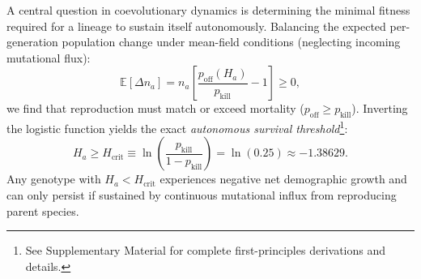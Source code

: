 \documentclass[twocolumn,amsmath,amssymb,aps,pra,10pt,floatfix,nofootinbib]{revtex4-2}
\begin{document}
A central question in coevolutionary dynamics is determining the minimal fitness required for a lineage to sustain itself autonomously. Balancing the expected per-generation population change under mean-field conditions (neglecting incoming mutational flux):
\begin{equation}
\mathbb{E}[\Delta n_a] = n_a \left[ \frac{p_{\text{off}}(H_a)}{p_{\text{kill}}} - 1 \right] \ge 0,
\end{equation}
we find that reproduction must match or exceed mortality ($p_{\text{off}} \ge p_{\text{kill}}$). Inverting the logistic function yields the exact \textit{autonomous survival threshold}\footnote[2]{See Supplementary Material for complete first-principles derivations and details.}:
\begin{equation}
H_a \ge H_{\text{crit}} \equiv \ln\left( \frac{p_{\text{kill}}}{1 - p_{\text{kill}}} \right) = \ln(0.25) \approx -1.38629.
\label{eq:Hcrit}
\end{equation}
Any genotype with $H_a < H_{\text{crit}}$ experiences negative net demographic growth and can only persist if sustained by continuous mutational influx from reproducing parent species.
\end{document}
